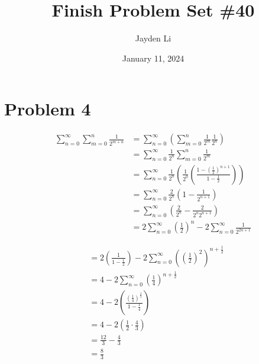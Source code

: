 \documentclass{article}
\title{Finish Problem Set \#40}
\author{Jayden Li}
\date{January 11, 2024}
\begin{document}

\fontsize{12pt}{12pt}\selectfont

\maketitle

\section*{Problem 4}
\centering
\begin{minipage}[t]{0.45\linewidth}
\setlength{\abovedisplayskip}{0pt}
\begin{align*}
	\sum_{n=0}^{\infty}\sum_{m=0}^{n}\frac{1}{2^{m+n}}&=
		\sum_{n=0}^{\infty}\left(\sum_{m=0}^{n}\frac{1}{2^m}
		\frac{1}{2^n}\right) \\
	&=\sum_{n=0}^{\infty}\frac{1}{2^n}\sum_{m=0}^{n}\frac{1}{2^m} \\
	&=\sum_{n=0}^{\infty}\frac{1}{2^n}\left(\frac{1}{2^0}\left(
		\frac{1-\left(\frac{1}{2}\right)^{n+1}}{1-\frac{1}{2}}
		\right)\right) \\
	&=\sum_{n=0}^{\infty}\frac{2}{2^n}\left(
		1-\frac{1}{2^{n+1}}\right) \\
	&=\sum_{n=0}^{\infty}\left(\frac{2}{2^n}-\frac{2}{2^n2^{n+1}}
		\right) \\
	&=2\sum_{n=0}^{\infty}\left(\frac{1}{2}\right)^n-
		2\sum_{n=0}^{\infty}\frac{1}{2^{2n+1}}
\end{align*}
\end{minipage}
\begin{minipage}[t]{0.45\linewidth}
\setlength{\abovedisplayskip}{0pt}
\begin{align*}
	&=2\left(\frac{1}{1-\frac{1}{2}}\right)-2\sum_{n=0}^{\infty}
		\left(\left(\frac{1}{2}\right)^2\right)^{n+\frac{1}{2}} \\
	&=4-2\sum_{n=0}^{\infty}\left(\frac{1}{4}\right)^{n+\frac{1}{2}} \\
	&=4-2\left(\frac{\left(\frac{1}{4}\right)^{\frac{1}{2}}}
		{1-\frac{1}{4}}\right) \\
	&=4-2\left(\frac{1}{2}\cdot\frac{4}{3}\right) \\
	&=\frac{12}{3}-\frac{4}{3} \\
	&=\boxed{\frac{8}{3}}
\end{align*}
\end{minipage}
\flushleft
\end{document}
